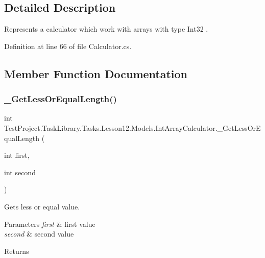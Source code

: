 \subsection{Detailed Description}
Represents a calculator which work with arrays with type Int32 . 



Definition at line 66 of file Calculator.\+cs.



\subsection{Member Function Documentation}
\mbox{\label{class_test_project_1_1_task_library_1_1_tasks_1_1_lesson12_1_1_models_1_1_int_array_calculator_a6b22d86c727f4072ce76d4bb58e9512b}} 
\subsubsection{\texorpdfstring{\_GetLessOrEqualLength()}{\_GetLessOrEqualLength()}}
{\footnotesize\ttfamily int Test\+Project.\+Task\+Library.\+Tasks.\+Lesson12.\+Models.\+Int\+Array\+Calculator.\+\_\+\+Get\+Less\+Or\+Equal\+Length (\begin{DoxyParamCaption}\item[{int}]{first,  }\item[{int}]{second }\end{DoxyParamCaption})}



Gets less or equal value. 


\begin{DoxyParams}{Parameters}
{\em first} & first value\\
\hline
{\em second} & second value\\
\hline
\end{DoxyParams}
\begin{DoxyReturn}{Returns}

\end{DoxyReturn}


